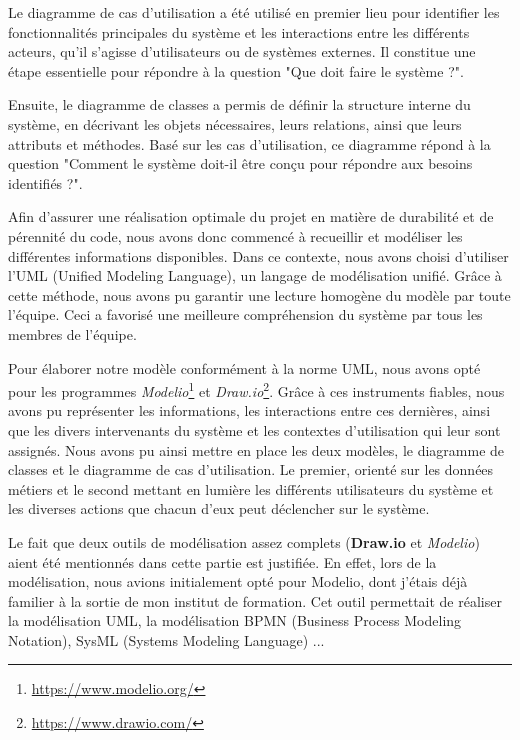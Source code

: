 {Le diagramme de cas d'utilisation a été utilisé en premier lieu pour identifier les fonctionnalités principales du système et les interactions entre les différents acteurs, qu'il s'agisse d'utilisateurs ou de systèmes externes. Il constitue une étape essentielle pour répondre à la question "Que doit faire le système ?".

\vspace{0.35cm}

Ensuite, le diagramme de classes a permis de définir la structure interne du système, en décrivant les objets nécessaires, leurs relations, ainsi que leurs attributs et méthodes. Basé sur les cas d'utilisation, ce diagramme répond à la question "Comment le système doit-il être conçu pour répondre aux besoins identifiés ?".

\vspace{0.35cm}

Afin d'assurer une réalisation optimale du projet en matière de durabilité et de pérennité du code, nous avons donc commencé à recueillir et modéliser les différentes informations disponibles. Dans ce contexte, nous avons choisi d'utiliser l'UML (Unified Modeling Language), un langage de modélisation unifié. Grâce à cette méthode, nous avons pu garantir une lecture homogène du modèle par toute l'équipe. Ceci a favorisé une meilleure compréhension du système par tous les membres de l'équipe. 

\vspace{0.35cm}

Pour élaborer notre modèle conformément à la norme UML, nous avons opté pour les programmes \textit{Modelio}\footnote{\url{https://www.modelio.org/}} et \textit{Draw.io}\footnote{\url{https://www.drawio.com/}}. Grâce à ces instruments fiables, nous avons pu représenter les informations, les interactions entre ces dernières, ainsi que les divers intervenants du système et les contextes d'utilisation qui leur sont assignés. Nous avons pu ainsi mettre en place les deux modèles, le diagramme de classes et le diagramme de cas d'utilisation. Le premier, orienté sur les données métiers et le second mettant en lumière les différents utilisateurs du système et les diverses actions que chacun d'eux peut déclencher sur le système.

\vspace{0.35cm}

Le fait que deux outils de modélisation assez complets (\textbf{Draw.io} et \textit{Modelio}) aient été mentionnés dans cette partie est justifiée. En effet, lors de la modélisation, nous avions initialement opté pour Modelio, dont j'étais déjà familier à la sortie de mon institut de formation. Cet outil permettait de réaliser la modélisation UML, la modélisation BPMN (Business Process Modeling Notation), SysML (Systems Modeling Language) ...

}
